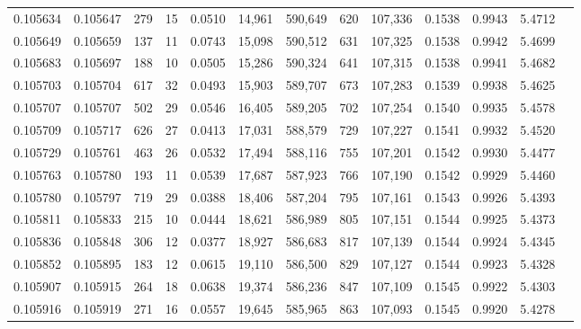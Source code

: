 \begin{tabular}{rrrrrrrrrrrrr}
0.105634 & 0.105647 &   279 &  15 &                                     0.0510 &  14,961 & 590,649 &     620 & 107,336 & 0.1538 & 0.9943 & 5.4712 \\
0.105649 & 0.105659 &   137 &  11 &                                     0.0743 &  15,098 & 590,512 &     631 & 107,325 & 0.1538 & 0.9942 & 5.4699 \\
0.105683 & 0.105697 &   188 &  10 &                                     0.0505 &  15,286 & 590,324 &     641 & 107,315 & 0.1538 & 0.9941 & 5.4682 \\
0.105703 & 0.105704 &   617 &  32 &                                     0.0493 &  15,903 & 589,707 &     673 & 107,283 & 0.1539 & 0.9938 & 5.4625 \\
0.105707 & 0.105707 &   502 &  29 &                                     0.0546 &  16,405 & 589,205 &     702 & 107,254 & 0.1540 & 0.9935 & 5.4578 \\
0.105709 & 0.105717 &   626 &  27 &                                     0.0413 &  17,031 & 588,579 &     729 & 107,227 & 0.1541 & 0.9932 & 5.4520 \\
0.105729 & 0.105761 &   463 &  26 &                                     0.0532 &  17,494 & 588,116 &     755 & 107,201 & 0.1542 & 0.9930 & 5.4477 \\
0.105763 & 0.105780 &   193 &  11 &                                     0.0539 &  17,687 & 587,923 &     766 & 107,190 & 0.1542 & 0.9929 & 5.4460 \\
0.105780 & 0.105797 &   719 &  29 &                                     0.0388 &  18,406 & 587,204 &     795 & 107,161 & 0.1543 & 0.9926 & 5.4393 \\
0.105811 & 0.105833 &   215 &  10 &                                     0.0444 &  18,621 & 586,989 &     805 & 107,151 & 0.1544 & 0.9925 & 5.4373 \\
0.105836 & 0.105848 &   306 &  12 &                                     0.0377 &  18,927 & 586,683 &     817 & 107,139 & 0.1544 & 0.9924 & 5.4345 \\
0.105852 & 0.105895 &   183 &  12 &                                     0.0615 &  19,110 & 586,500 &     829 & 107,127 & 0.1544 & 0.9923 & 5.4328 \\
0.105907 & 0.105915 &   264 &  18 &                                     0.0638 &  19,374 & 586,236 &     847 & 107,109 & 0.1545 & 0.9922 & 5.4303 \\
0.105916 & 0.105919 &   271 &  16 &                                     0.0557 &  19,645 & 585,965 &     863 & 107,093 & 0.1545 & 0.9920 & 5.4278 \\

\end{tabular}
